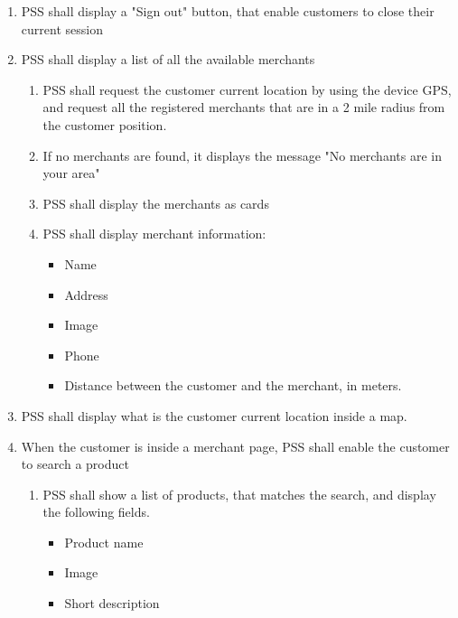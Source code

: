 \begin{enumerate}[label=SY-\arabic*]
    \item PSS shall display a "Sign out" button, that enable customers to close 
    their current session
    \pagebreak
    \item PSS shall display a list of all the available merchants
    \begin{enumerate}[label=SY6-\arabic*]
        \item PSS shall request the customer current location by using the 
        device GPS, and request all the registered merchants that are in a 
        2 mile radius from the customer position.
        \item If no merchants are found, it displays the message "No merchants 
        are in your area"
        \item PSS shall display the merchants as 
        cards \cite{material-design-cards}
        \item PSS shall display merchant information: 
        \begin{itemize}
            \item Name
            \item Address
            \item Image
            \item Phone
            \item Distance between the customer and the merchant, in meters.
        \end{itemize}
    \end{enumerate}
    \item PSS shall display what is the customer current location 
    inside a map.
    \item When the customer is inside a merchant page, PSS shall enable the 
    customer to search a product
    \begin{enumerate}[label=SY8-\arabic*]
        \item PSS shall show a list of products, that matches the search, 
        and display the following fields.
        \begin{itemize}
            \item Product name
            \item Image 
            \item Short description
        \end{itemize}
    \end{enumerate}
    \end{enumerate}
